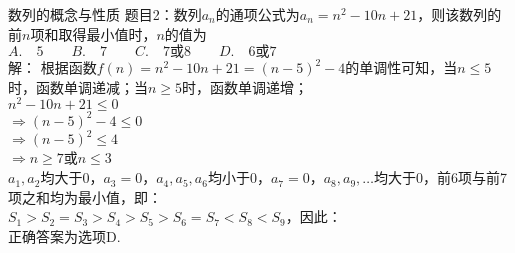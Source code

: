 \documentclass[aspectratio=169]{ctexbeamer} %
\date{\today}
\begin{document}
\begin{frame}[t]{数列的概念与性质}
题目2：数列${a_n}$的通项公式为$a_n = n^2 - 10n + 21$，则该数列的前$n$项和取得最小值时，$n$的值为\\
$A. \quad 5 \qquad B. \quad 7 \qquad C. \quad 7\text{或}8 \qquad D. \quad 6\text{或}7$ \\
\pause
解：
\pause
根据函数$f(n) = n^2 - 10n + 21 = (n-5)^2 -4$的单调性可知，当$n \le 5$时，函数单调递减；当$n \ge 5$时，函数单调递增；\\
\pause
$n^2 - 10n + 21 \le 0$ \\
\pause
$\Rightarrow (n-5)^2 - 4 \le 0$ \\
\pause
$\Rightarrow (n-5)^2 \le 4$ \\
\pause
$\Rightarrow n \ge 7$或$n \le 3$ \\
\pause
$a_1, a_2$均大于0，$a_3 = 0$，$a_4, a_5, a_6$均小于0，$a_7 = 0$，$a_8, a_9, \dots$均大于0，前6项与前7项之和均为最小值，即：\\
\pause
$S_1 > S_2 = S_3 > S_4 > S_5 > S_6 = S_7 < S_8 < S_9$，因此：\\
\pause
正确答案为选项D.
\end{frame}
\end{document}
